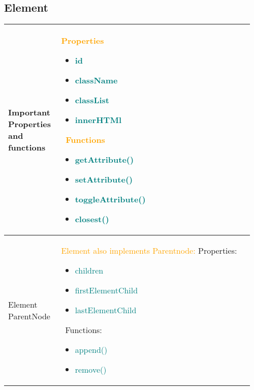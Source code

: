 \documentclass[main.tex,fontsize=8pt,paper=a4,paper=portrait,DIV=calc,]{scrartcl}
\begin{document}
\begin{table}[!ht]
\subsection{Element}
\begin{tabular}{|m{0.2\linewidth}|m{0.755\linewidth}|}
\hline
Important Properties and functions & 
\textcolor{orange}{\textbf{Properties}}
\begin{itemize}
  \item \textcolor{teal}{id} 
  \item \textcolor{teal}{className} 
  \item \textcolor{teal}{classList} 
  \item \textcolor{teal}{innerHTMl}
\end{itemize}
\, \newline
\textcolor{orange}{Functions}\newline
\begin{itemize}
  \item \textcolor{teal}{getAttribute()}
  \item \textcolor{teal}{setAttribute()}
  \item \textcolor{teal}{toggleAttribute()}
  \item \textcolor{teal}{closest()}
  \vspace{-3mm}
\end{itemize}\\
\hline
Element ParentNode & 
\textcolor{orange}{Element also implements Parentnode:}\newline
Properties:\newline
\begin{itemize}
  \item \textcolor{teal}{children}
  \item \textcolor{teal}{firstElementChild}
  \item \textcolor{teal}{lastElementChild}
\end{itemize}
\, \newline
Functions:\newline
\begin{itemize}
  \item \textcolor{teal}{append()} 
  \item \textcolor{teal}{remove()}
  \vspace{-3mm}
\end{itemize}\\
\hline
\end{tabular}

\end{table}
\end{document}
